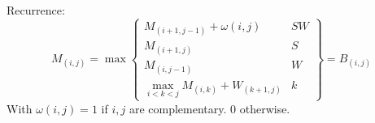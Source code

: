 \documentclass[11pt]{article}
\def\ul{\begin{itemize}}
\def\ule{\end{itemize}}
\begin{document}
Recurrence:
\[M_{(i,j)}=\max\left\{\begin{array}{l|l}
	M_{(i+1,j-1)}+\omega(i,j) & SW\\
	M_{(i+1,j)} & S\\
	M_{(i,j-1)} & W\\
	\max_{i<k<j}M_{(i,k)}+W_{(k+1,j)} & k
\end{array}\right\} = B_{(i,j)} \]
With $\omega(i,j)=1$ if $i,j$ are complementary. 0 otherwise.

%
%
%
%
\end{document}
